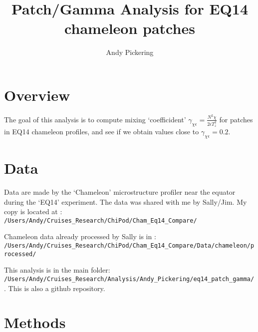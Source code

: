 \documentclass[11pt]{article}
\title{Patch/Gamma Analysis for EQ14 chameleon patches}
\author{Andy Pickering}
\begin{document}
\maketitle

\tableofcontents
\newpage

\section{Overview}

The goal of this analysis is to compute mixing `coefficident' $\gamma_{\chi\epsilon}=\frac{N^2 \chi}{2\epsilon T_{z}^{2}} $ for patches in EQ14 chameleon profiles, and see if we obtain values close to $\gamma_{\chi\epsilon}=0.2$.

\section{Data}

Data are made by the `Chameleon' microstructure profiler near the equator during the `EQ14' experiment. The data was shared with me by Sally/Jim. My copy is located at : 
\newline
\verb+/Users/Andy/Cruises_Research/ChiPod/Cham_Eq14_Compare/+
\medskip

Chameleon data already processed by Sally is in : \newline
\verb+/Users/Andy/Cruises_Research/ChiPod/Cham_Eq14_Compare/Data/chameleon/processed/+

\medskip

This analysis is in the main folder: \newline  \verb+/Users/Andy/Cruises_Research/Analysis/Andy_Pickering/eq14_patch_gamma/+ . This is also a github repository.






\section{Methods}
\end{document}
